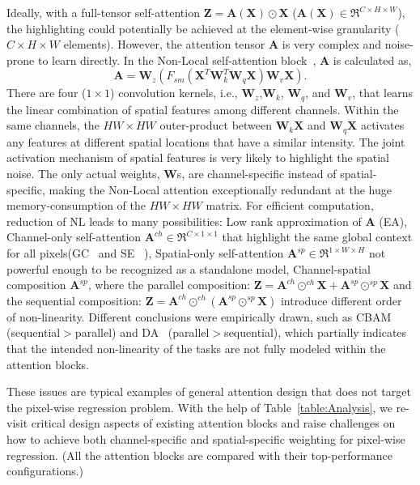 \documentclass[10pt,twocolumn,letterpaper]{article}
\newcommand{\X}{\mathbf{X}}
\newcommand{\Z}{\mathbf{Z}}
\newcommand{\A}{\mathbf{A}}
\newcommand{\W}{\mathbf{W}}
\begin{document}
Ideally, with a full-tensor self-attention $\Z= \A(\X) \odot \X$ ($\A(\X)\in \Re^{C\times H \times W}$), the highlighting could potentially be achieved at the element-wise granularity ($C\times H \times W$ elements). However, the attention tensor $\A$ is very complex and noise-prone to learn directly. In the Non-Local self-attention block~\cite{Wang18nonlocal}, $\A$ is calculated as,  
\begin{equation}
\A=  \W_{z}(F_{sm}(\X^{T}\W_{k}^{T}\W_{q}\X)\W_{v}\X). 
\end{equation}
There are four ($1\times 1$) convolution kernels, i.e.,  $\W_{z}$,$\W_{k}$, $\W_{q}$, and $\W_{v}$, that learns the linear combination of spatial features among different channels. Within the same channels, the $HW\times HW$ outer-product between $\W_{k}\X$ and $\W_{q}\X$ activates any features at different spatial locations that have a similar intensity. The joint activation mechanism of spatial features is very likely to highlight the spatial noise. The only actual weights, $\W$s, are channel-specific instead of spatial-specific, making the Non-Local attention exceptionally redundant at the huge memory-consumption of the $HW\times HW$ matrix. 
For efficient computation, reduction of NL leads to many possibilities: Low rank approximation of $\A$ (EA), Channel-only self-attention $\A^{ch}\in \Re^{C\times 1 \times 1}$ that highlight the same global context for all pixels(GC~\cite{Cao19} and SE~\cite{Hu18b} ), Spatial-only self-attention $\A^{sp}\in \Re^{1\times W \times H}$ not powerful enough to be recognized as a standalone model, Channel-spatial composition $\A^{sp}$, where the parallel composition: $\Z= \A^{ch} \odot^{ch}\X+ \A^{sp} \odot^{sp} \X $ and the sequential composition: $\Z= \A^{ch} \odot^{ch}(\A^{sp} \odot^{sp}\X)$ introduce different order of non-linearity. Different conclusions were empirically drawn, such as CBAM~\cite{Sanghyun2018cbam}  (sequential$>$parallel) and DA~\cite{Fu2019} (parallel$>$sequential), which partially indicates that the intended non-linearity of the tasks are not fully modeled within the attention blocks. 

These issues are typical examples of general attention design that does not target the pixel-wise regression problem. With the help of Table~\ref{table:Analysis}, we re-visit critical design aspects of existing attention blocks and raise challenges on how to achieve both channel-specific and spatial-specific weighting for pixel-wise regression. (All the attention blocks are compared with their top-performance configurations.) 
\end{document}

